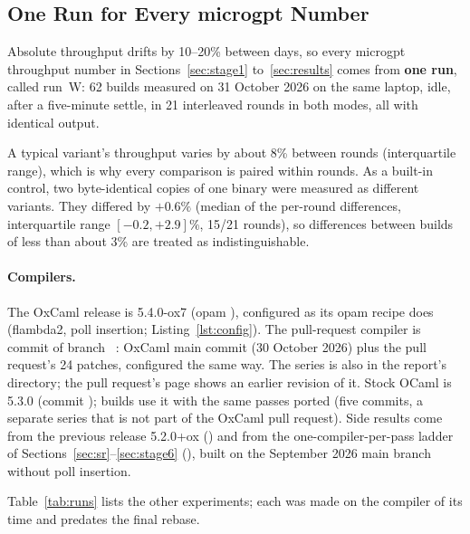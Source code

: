 \subsection{One Run for Every microgpt Number}
\label{sec:runu}
Absolute throughput drifts by 10--20\% between days, so every microgpt
throughput number in Sections~\ref{sec:stage1} to~\ref{sec:results} comes
from \textbf{one run}, called run~W: 62 builds measured on 31 October 2026 on
the same laptop, idle, after a five-minute settle, in 21 interleaved rounds in
both modes, all with identical output.

A typical variant's throughput varies by about 8\% between rounds
(interquartile range), which is why every comparison is paired within rounds.
As a built-in control, two byte-identical copies of one binary were measured
as different variants. They differed by $+0.6\%$
(median of the per-round differences, interquartile range
$[-0.2, +2.9]\%$, 15/21 rounds), so
differences between builds of less than about 3\% are treated as
indistinguishable.

\paragraph{Compilers.} The OxCaml release is 5.4.0-ox7 (opam
), configured as its opam recipe does
(flambda2, poll insertion; Listing~\ref{lst:config}). The pull-request
compiler is commit  of branch
~\cite{oxcaml_pr}: OxCaml main commit 
(30 October 2026) plus the pull request's 24 patches, configured the same
way. The series is also in the report's  directory; the
pull request's page shows an earlier revision of it. Stock
OCaml is 5.3.0 (commit );  builds use it with
the same passes ported (five commits, a separate series that is not part of
the OxCaml pull request). Side results come from the previous release
5.2.0+ox () and from the one-compiler-per-pass ladder of
Sections~\ref{sec:sr}--\ref{sec:stage6} (), built on the
September 2026 main branch without poll insertion.

Table~\ref{tab:runs} lists the other experiments; each was made on the
compiler of its time and predates the final rebase.

